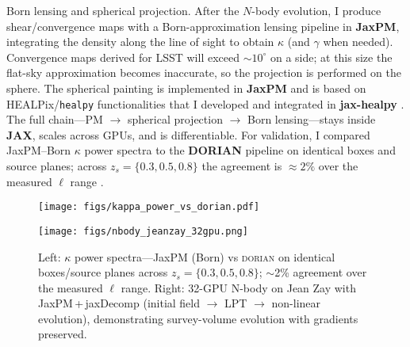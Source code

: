 \documentclass{article}
\begin{document}
Born lensing and spherical projection. After the \(N\)-body evolution, I produce shear/convergence maps with a Born-approximation lensing pipeline in \textbf{JaxPM}, integrating the density along the line of sight to obtain \(\kappa\) (and \(\gamma\) when needed). Convergence maps derived for LSST will exceed \(\sim 10^\circ\) on a side; at this size the flat-sky approximation becomes inaccurate, so the projection is performed on the sphere. The spherical painting is implemented in \textbf{JaxPM} and is based on HEALPix/\texttt{healpy} functionalities that I developed and integrated in \textbf{jax-healpy} \citep{Gorski2005,healpy,jax-healpy}. The full chain—PM \(\rightarrow\) spherical projection \(\rightarrow\) Born lensing—stays inside \textbf{JAX}, scales across GPUs, and is differentiable. For validation, I compared JaxPM–Born \(\kappa\) power spectra to the \textbf{DORIAN} pipeline on identical boxes and source planes; across \(z_s=\{0.3,0.5,0.8\}\) the agreement is \(\approx 2\%\) over the measured \(\ell\) range \citep{DORIAN}.

\begin{figure}[!t]
  \centering
  \begin{minipage}[t]{0.49\linewidth}
    \centering
    \texttt{[image: figs/kappa\_power\_vs\_dorian.pdf]}
  \end{minipage}\hfill
  \begin{minipage}[t]{0.49\linewidth}
    \centering
    \texttt{[image: figs/nbody\_jeanzay\_32gpu.png]}
  \end{minipage}
  \caption{Left: $\kappa$ power spectra—JaxPM (Born) vs \textsc{dorian} on identical
  boxes/source planes across $z_s=\{0.3,0.5,0.8\}$; $\sim$2\% agreement over the measured
  $\ell$ range. Right: 32-GPU N-body on Jean Zay with JaxPM\,+\,jaxDecomp
  (initial field $\rightarrow$ LPT $\rightarrow$ non-linear evolution), demonstrating
  survey-volume evolution with gradients preserved.}
  \label{fig:lss-two}
\end{figure}

\end{document}
